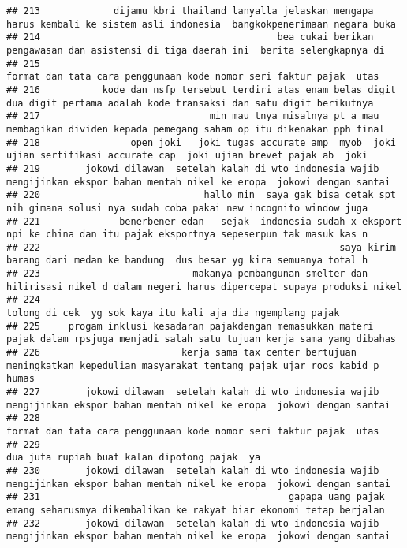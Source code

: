 \documentclass[
]{article}
\begin{document}
\begin{verbatim}
## 213             dijamu kbri thailand lanyalla jelaskan mengapa harus kembali ke sistem asli indonesia  bangkokpenerimaan negara buka
## 214                                          bea cukai berikan pengawasan dan asistensi di tiga daerah ini  berita selengkapnya di  
## 215                                                              format dan tata cara penggunaan kode nomor seri faktur pajak  utas 
## 216           kode dan nsfp tersebut terdiri atas enam belas digit dua digit pertama adalah kode transaksi dan satu digit berikutnya
## 217                              min mau tnya misalnya pt a mau membagikan dividen kepada pemegang saham op itu dikenakan pph final 
## 218                open joki   joki tugas accurate amp  myob  joki ujian sertifikasi accurate cap  joki ujian brevet pajak ab  joki 
## 219        jokowi dilawan  setelah kalah di wto indonesia wajib mengijinkan ekspor bahan mentah nikel ke eropa  jokowi dengan santai
## 220                             hallo min  saya gak bisa cetak spt nih gimana solusi nya sudah coba pakai new incognito window juga 
## 221              benerbener edan   sejak  indonesia sudah x eksport npi ke china dan itu pajak eksportnya sepeserpun tak masuk kas n
## 222                                                     saya kirim barang dari medan ke bandung  dus besar yg kira semuanya total h 
## 223                           makanya pembangunan smelter dan hilirisasi nikel d dalam negeri harus dipercepat supaya produksi nikel
## 224                                                                      tolong di cek  yg sok kaya itu kali aja dia ngemplang pajak
## 225     progam inklusi kesadaran pajakdengan memasukkan materi pajak dalam rpsjuga menjadi salah satu tujuan kerja sama yang dibahas
## 226                         kerja sama tax center bertujuan meningkatkan kepedulian masyarakat tentang pajak ujar roos kabid p humas
## 227        jokowi dilawan  setelah kalah di wto indonesia wajib mengijinkan ekspor bahan mentah nikel ke eropa  jokowi dengan santai
## 228                                                              format dan tata cara penggunaan kode nomor seri faktur pajak  utas 
## 229                                                                                    dua juta rupiah buat kalan dipotong pajak  ya
## 230        jokowi dilawan  setelah kalah di wto indonesia wajib mengijinkan ekspor bahan mentah nikel ke eropa  jokowi dengan santai
## 231                                            gapapa uang pajak emang seharusmya dikembalikan ke rakyat biar ekonomi tetap berjalan
## 232        jokowi dilawan  setelah kalah di wto indonesia wajib mengijinkan ekspor bahan mentah nikel ke eropa  jokowi dengan santai

\end{verbatim}
\end{document}
